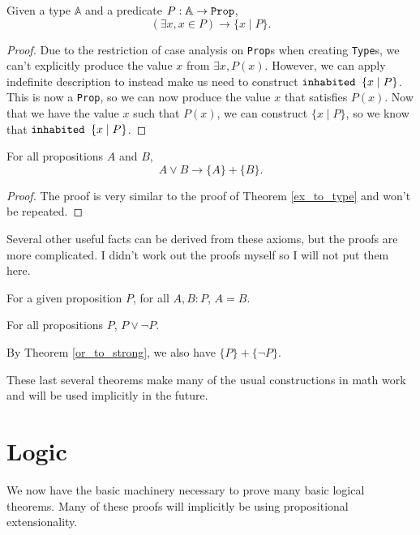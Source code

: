 \documentclass[../math.tex]{subfiles}
\begin{document}
\begin{theorem} \label{ex_to_type}
    Given a type $\mathbb A$ and a predicate $P : \mathbb A \rightarrow
    \verb|Prop|$,
    \[
        (\exists x, x \in P) \rightarrow \{x \mid P\}.
    \]
\end{theorem}
\begin{proof}
    Due to the restriction of case analysis on \verb|Prop|s when creating
    \verb|Type|s, we can't explicitly produce the value $x$ from $\exists x,
    P(x)$.  However, we can apply indefinite description to instead make us
    need to construct $\verb|inhabited | \{x \mid P\}$.  This is now a
    \verb|Prop|, so we can now produce the value $x$ that satisfies $P(x)$.  Now
    that we have the value $x$ such that $P(x)$, we can construct $\{x \mid
    P\}$, so we know that $\verb|inhabited | \{x \mid P\}$.
\end{proof}

\begin{theorem} \label{or_to_strong}
    For all propositions $A$ and $B$,
    \[
        A \vee B \rightarrow \{A\} + \{B\}.
    \]
\end{theorem}
\begin{proof}
    The proof is very similar to the proof of Theorem \ref{ex_to_type} and won't
    be repeated.
\end{proof}

Several other useful facts can be derived from these axioms, but the proofs are
more complicated.  I didn't work out the proofs myself so I will not put them
here.

\begin{theorem}
    For a given proposition $P$, for all $A, B : P$, $A = B$.
\end{theorem}

\begin{theorem}
    For all propositions $P$, $P \vee \neg P$.
\end{theorem}
\noindent By Theorem \ref{or_to_strong}, we also have $\{P\} + \{\neg P\}$.

These last several theorems make many of the usual constructions in math work
and will be used implicitly in the future.

\section{Logic}

We now have the basic machinery necessary to prove many basic logical theorems.
Many of these proofs will implicitly be using propositional extensionality.
\end{document}
